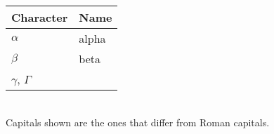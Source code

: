 
\renewcommand{\nomname}{Notation} %
\renewcommand{\nompreamble}{The following are the symbols that will be presented within this document to explain different formulas, ranging from image-based operations to optimization functions. } %

\printnomenclature %

\vspace{1cm}

\begin{center}
	\newcommand{\pronounced}[1]{\hspace*{.2em}\small\textit{#1}}
	\begin{tabularx}{\textwidth}{l l}
		\toprule
		Character & Name\\ 
		\midrule
		$\alpha$ & alpha \\
		$\beta$ & beta\\ 
		$\gamma$, $\Gamma$ \\
		\bottomrule
	\end{tabularx} \\[1.5ex]
	Capitals shown are the ones that differ from Roman capitals.
\end{center}